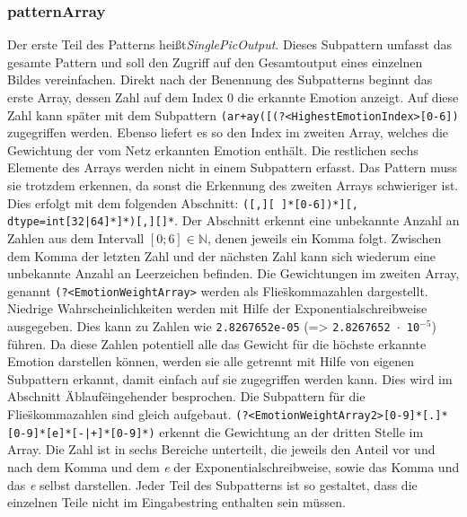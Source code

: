 \documentclass[10pt,a4paper]{report}
\begin{document}
\subsubsection{patternArray}
Der erste Teil des Patterns heißt\textit{SinglePicOutput}. Dieses Subpattern umfasst das gesamte Pattern und soll den 
Zugriff auf den Gesamtoutput eines einzelnen Bildes vereinfachen. Direkt nach der Benennung des Subpatterns beginnt 
das erste Array, dessen Zahl auf dem Index 0 die erkannte Emotion anzeigt. Auf diese Zahl kann später mit dem Subpattern 
\texttt{(ar+ay([(?<HighestEmotionIndex>[0-6])} zugegriffen werden.  Ebenso liefert es so den Index im zweiten Array, 
welches die Gewichtung der vom Netz erkannten Emotion enthält. Die restlichen sechs Elemente des Arrays werden nicht in 
einem Subpattern erfasst. Das Pattern muss sie trotzdem erkennen, da  sonst die Erkennung des zweiten Arrays 
schwieriger ist. Dies erfolgt mit dem folgenden Abschnitt: \texttt{([,][ ]*[0-6])*][, dtype=int[32|64]*]*)[,][]*}. Der Abschnitt 
erkennt eine unbekannte Anzahl an Zahlen aus dem Intervall $\left[0;6\right] \in \mathbb{N}$, denen jeweils ein Komma 
folgt. Zwischen dem Komma der letzten Zahl und der nächsten Zahl kann sich wiederum eine unbekannte Anzahl an 
Leerzeichen befinden.
Die Gewichtungen im zweiten Array, genannt \texttt{(?<EmotionWeightArray>} werden als Flie\"{s}kommazahlen 
dargestellt. Niedrige Wahrscheinlichkeiten werden mit Hilfe der Exponentialschreibweise ausgegeben. Dies kann zu Zahlen 
wie \texttt{2.8267652e-05} (=> \texttt{2.8267652 $\cdot$ 10$^{-5}$}) führen. Da diese Zahlen potentiell alle das Gewicht 
für die höchste erkannte Emotion darstellen können, werden sie alle getrennt mit Hilfe von eigenen Subpattern erkannt, 
damit einfach auf sie zugegriffen werden kann. Dies wird im Abschnitt \"Ablauf\" eingehender besprochen. Die Subpattern 
für die Flie\"{s}kommazahlen sind gleich aufgebaut. \texttt{(?<EmotionWeightArray2>[0-9]*[.]*[0-9]*[e]*[-|+]*[0-9]*)} 
erkennt die Gewichtung an der dritten Stelle im Array. Die Zahl ist in sechs Bereiche unterteilt, die jeweils den Anteil vor und  
nach dem Komma und dem \textit{e} der Exponentialschreibweise, sowie das Komma und das  \textit{e} selbst darstellen. 
Jeder Teil des Subpatterns ist so gestaltet, dass die einzelnen Teile nicht im Eingabestring enthalten sein müssen.
\end{document}
